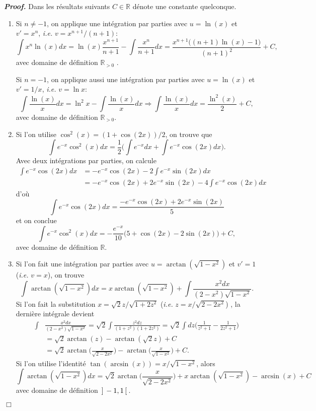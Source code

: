 \documentclass[11pt,a4paper]{article}
\newcommand{\RR}{\mathbb{R}}
\newcommand{\R}{\RR}
\newenvironment{preuve}[1][]
{\vskip 2mm  \noindent\emph{\bf Proof#1. }}{$\Box$ \vskip 2mm}
\begin{document}
\begin{preuve}
Dans les résultats suivants $C \in \R$ dénote une constante quelconque. 
\begin{enumerate}
\item Si $n \neq -1$, on applique une intégration par parties avec $u = \ln(x)$ et $v' = x^{n}$, \textit{i.e.} $v = x^{n+1}/(n+1)$: 
\[     \int x^n\ln(x)dx =  \ln(x)\frac{x^{n+1}}{n+1}- \int \frac{x^{n}}{n+1}dx =
\frac{x^{n+1} \big( (n+1) \ln(x) - 1\big)}{(n+1)^{2}} + C,     \] 
avec domaine de définition $\R_{>0}$ .

Si $n=-1$, on applique aussi une intégration par parties avec $u = \ln(x)$ et $v' = 1/x$, \textit{i.e.} $v = \ln x$: 
\[     \int \frac{\ln(x)}{x}dx = \ln^2 x - \int \frac{\ln(x)}{x}dx \Rightarrow \int \frac{\ln(x)}{x}dx = \frac{\ln^{2}(x)}{2} + C,     \]
avec domaine de définition $\R_{>0}$.
\item Si l'on utilise $\cos^{2} (x) = (1 + \cos(2x))/2$, on trouve que 
\[
 \int e^{-x} \cos^{2} (x) dx = \frac{1}{2} \bigg( \int e^{-x} dx + \int e^{-x} \cos (2x) dx \bigg).
\]
Avec deux int\'egrations par parties, on calcule
\begin{align*}
     \int e^{-x}\cos (2x) dx&=  -e^{-x} \cos (2x) - 2\int e^{-x} \sin(2x) dx\\
      &= -e^{-x} \cos (2x) +2e^{-x} \sin (2x) -4\int e^{-x} \cos(2x) dx
\end{align*}     
d'o\`u
\[
\int e^{-x}\cos (2x) dx = \frac{-e^{-x} \cos (2x) +2e^{-x} \sin (2x)}5
\]
et on conclue
\[      
 \int e^{-x} \cos^{2} (x) dx     = - \frac{e^{-x}}{10} \big(5+\cos(2x)-2 \sin(2x)\big) + C,
\]
avec domaine de définition $\R$.

\item Si l'on fait une intégration par parties avec $u = \arctan(\sqrt{1-x^2})$ et $v' = 1$ (\textit{i.e.} $v = x$), on trouve
\[     \int \arctan(\sqrt{1-x^2})dx= x \arctan(\sqrt{1-x^2}) + \int \frac{x^{2} dx}{(2-x^{2}) \sqrt{1 - x^{2}}}.     \]
Si l'on fait la substitution $x = \sqrt{2} z/\sqrt{1+2 z^{2}}$ (\textit{i.e.} $z = x/\sqrt{2-2x^{2}}$) , la dernière intégrale devient 
\begin{align*}     
\int &\frac{x^{2} dx}{(2-x^{2}) \sqrt{1 - x^{2}}} = \sqrt{2} \int \frac{z^{2} dz}{(1+z^{2})(1+2z^{2})} = \sqrt{2} \int dz\bigg(\frac{1}{z^{2}+1}-\frac{1}{2z^{2}+1} \bigg) 
\\
&= \sqrt{2} \arctan(z) - \arctan (\sqrt{2} z) + C 
\\
&= \sqrt{2} \arctan\bigg(\frac{x}{\sqrt{2-2 x^2}}\bigg) - \arctan\bigg(\frac{x}{\sqrt{1-x^2}}\bigg) + C.
\end{align*} 
Si l'on utilise l'identité $\tan(\arcsin(x)) = x/\sqrt{1-x^{2}}$, alors  
\[     \int \arctan(\sqrt{1-x^2})dx= \sqrt{2} \arctan\bigg(\frac{x}{\sqrt{2-2 x^2}}\bigg) + x \arctan(\sqrt{1-x^2}) - \arcsin(x) + C     \]
avec domaine de définition $\hskip 0.6mm ]\hskip 0.6mm -1,1\hskip 0.6mm[\hskip 0.6mm$.
\end{enumerate}
\end{preuve}
\end{document}
